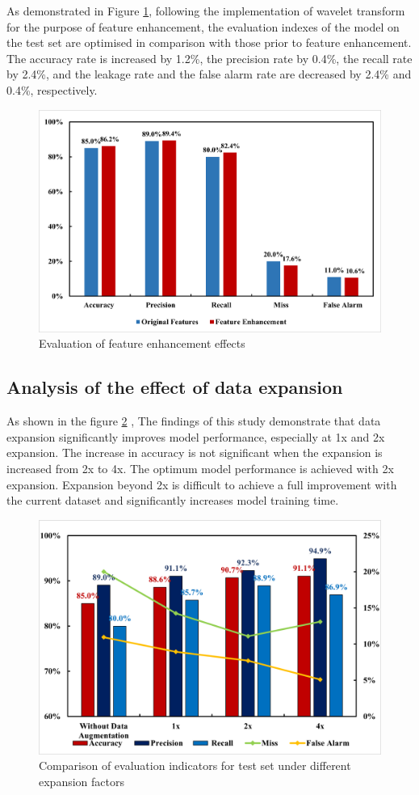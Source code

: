 \documentclass[journal,article,submit,pdftex,moreauthors]{Definitions/mdpi}
\begin{document}
As demonstrated in Figure \ref{fig:Evaluation of feature enhancement effects}, following the implementation of wavelet transform for the purpose of feature enhancement, the evaluation indexes of the model on the test set are optimised in comparison with those prior to feature enhancement. The accuracy rate is increased by 1.2\%, the precision rate by 0.4\%, the recall rate by 2.4\%, and the leakage rate and the false alarm rate are decreased by 2.4\% and 0.4\%, respectively.

\begin{figure}[H]
    \centering
    \includegraphics[width=0.75\linewidth]{图片/特征增强.png}
    \caption{Evaluation of feature enhancement effects}
    \label{fig:Evaluation of feature enhancement effects}
\end{figure}

\subsection{Analysis of the effect of data expansion}

As shown in the figure    \ref{fig:Analysis of the effect of data expansion} , The findings of this study demonstrate that data expansion significantly improves model performance, especially at 1x and 2x expansion. The increase in accuracy is not significant when the expansion is increased from 2x to 4x. The optimum model performance is achieved with 2x expansion. Expansion beyond 2x is difficult to achieve a full improvement with the current dataset and significantly increases model training time.

\begin{figure}[H]
    \centering
    \includegraphics[width=0.75\linewidth]{图片/数据扩充.png}
    \caption{Comparison of evaluation indicators for test set under different expansion factors}
    \label{fig:Analysis of the effect of data expansion}
\end{figure}
\end{document}
